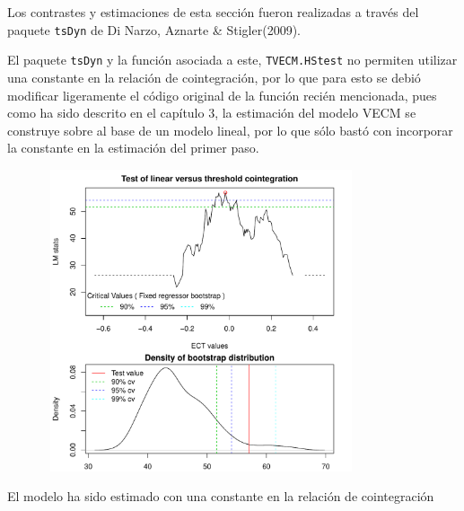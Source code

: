 \documentclass[12pt, twoside]{book}\usepackage[]{graphicx}\usepackage[]{color}
\newenvironment{knitrout}{}{} %
\numberwithin{equation}{section}
\numberwithin{theorem}{section}
\numberwithin{teorema}{section}
\numberwithin{defi}{section}
\numberwithin{prop}{section}
\numberwithin{defi}{section}
\theoremstyle{plain}
\begin{document}
Los contrastes y estimaciones de esta sección fueron realizadas a través del paquete \texttt{tsDyn} de Di Narzo, Aznarte \& Stigler(2009).

El paquete \texttt{tsDyn} y la función asociada a este, \texttt{TVECM.HStest} no permiten utilizar una constante en la relación de cointegración, por lo que para esto se debió modificar ligeramente el código original de la función recién mencionada, pues como ha sido descrito en el capítulo 3, la estimación del modelo VECM se construye sobre al base de un modelo lineal, por lo que sólo bastó con incorporar la constante en la estimación del primer paso. 

\begin{knitrout}
\color{fgcolor}

{\centering \includegraphics[width=4.5in,height=3.5in]{figure/unnamed-chunk-24-1} 

}



\end{knitrout}


El modelo ha sido estimado con una constante en la relación de cointegración
\end{document}
